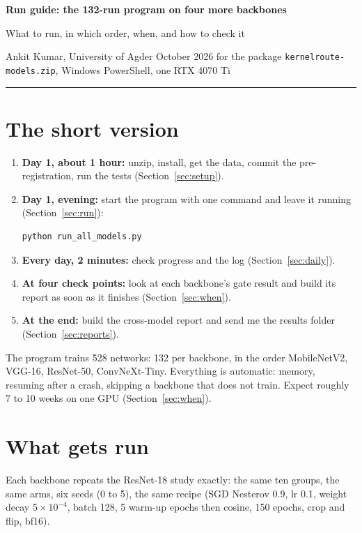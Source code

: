 \documentclass[10.5pt,a4paper]{article}
\newcommand{\cmd}[1]{\texttt{#1}}
\begin{document}
{\LARGE\bfseries\color{accent} Run guide: the 132-run program on four more backbones}\par\smallskip
{\large What to run, in which order, when, and how to check it}\par\smallskip
{\small Ankit Kumar, University of Agder \quad\textbullet{} October 2026 \quad\textbullet\quad for the package \cmd{kernelroute-models.zip}, Windows PowerShell, one RTX 4070 Ti}
\vspace{6pt}\hrule\vspace{8pt}

\section*{The short version}

\begin{enumerate}[label=\textbf{\arabic*.},leftmargin=1.6em]
\item \textbf{Day 1, about 1 hour:} unzip, install, get the data, commit the pre-registration, run the tests (Section~\ref{sec:setup}).
\item \textbf{Day 1, evening:} start the program with one command and leave it running (Section~\ref{sec:run}):
\begin{lstlisting}
python run_all_models.py
\end{lstlisting}
\item \textbf{Every day, 2 minutes:} check progress and the log (Section~\ref{sec:daily}).
\item \textbf{At four check points:} look at each backbone's gate result and build its report as soon as it finishes (Section~\ref{sec:when}).
\item \textbf{At the end:} build the cross-model report and send me the results folder (Section~\ref{sec:reports}).
\end{enumerate}

The program trains 528 networks: 132 per backbone, in the order MobileNetV2, VGG-16, ResNet-50, ConvNeXt-Tiny. Everything is automatic: memory, resuming after a crash, skipping a backbone that does not train. Expect roughly 7 to 10 weeks on one GPU (Section~\ref{sec:when}).

\section{What gets run}\label{sec:what}

Each backbone repeats the ResNet-18 study exactly: the same ten groups, the same arms, six seeds (0 to 5), the same recipe (SGD Nesterov 0.9, lr 0.1, weight decay $5\times10^{-4}$, batch 128, 5 warm-up epochs then cosine, 150 epochs, crop and flip, bf16).
\end{document}
